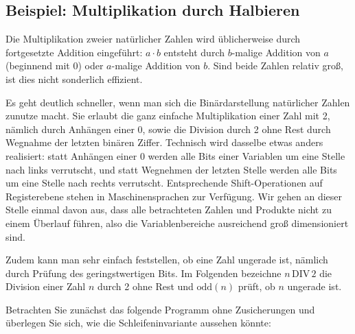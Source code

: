 \clearpage %

\subsection{Beispiel: Multiplikation durch Halbieren}
\label{sec:Kap-11-2-4}

Die Multiplikation zweier natürlicher Zahlen wird üblicherweise durch fortgesetzte Addition eingeführt: $a \cdot b$ entsteht durch $b$-malige Addition von $a$ (beginnend mit 0) oder $a$-malige Addition von $b$. Sind beide Zahlen relativ groß, ist dies nicht sonderlich effizient.

\vspace{2mm} %

Es geht deutlich schneller, wenn man sich die Binärdarstellung natürlicher Zahlen zunutze macht. Sie erlaubt die ganz einfache Multiplikation einer Zahl mit 2, nämlich durch Anhängen einer 0, sowie die Division durch 2 ohne Rest durch Wegnahme der letzten binären Ziffer. Technisch wird dasselbe etwas anders realisiert: statt Anhängen einer 0 werden alle Bits einer Variablen um eine Stelle nach links verrutscht, und statt Wegnehmen der letzten Stelle werden alle Bits um eine Stelle nach rechts verrutscht. Entsprechende Shift-Operationen auf Registerebene stehen in Maschinensprachen zur Verfügung. Wir gehen an dieser Stelle einmal davon aus, dass alle betrachteten Zahlen und Produkte nicht zu einem Überlauf führen, also die Variablenbereiche ausreichend groß dimensioniert sind. 

\vspace{2mm} %

Zudem kann man sehr einfach feststellen, ob eine Zahl ungerade ist, nämlich durch Prüfung des geringstwertigen Bits. Im Folgenden bezeichne $n \, \text{DIV} \, 2$ die Division einer Zahl $n$ durch 2 ohne Rest und $\text{odd}(n)$ prüft, ob $n$ ungerade ist.

\vspace{2mm} %

Betrachten Sie zunächst das folgende Programm ohne Zusicherungen und überlegen Sie sich, wie die Schleifeninvariante aussehen könnte:

\vspace{\baselineskip}

